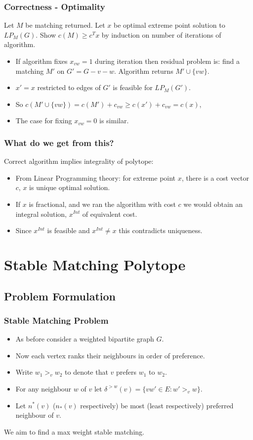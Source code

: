 \documentclass{beamer}
\begin{document}
\begin{frame}
\frametitle{Correctness - Optimality}
Let $M$ be matching returned. Let $x$ be optimal extreme point solution to $LP_M(G)$. Show $c(M) \geq c^Tx$ by induction on number of iterations of algorithm.
\begin{itemize}
\item<1-> If algorithm fixes $x_{vw} = 1$ during iteration then residual problem is: find a matching $M'$ on $G'=G-v-w$. Algorithm returns $M' \cup \{vw\}$.
\item<2-> $x' = x$ restricted to edges of $G'$ is feasible for $LP_M(G')$.
\item<3-> So $c(M' \cup \{vw\}) = c(M') + c_{vw} \geq c(x') + c_{vw} = c(x)$,
\item<4-> The case for fixing $x_{vw} = 0$ is similar.
\end{itemize}
\end{frame}

\begin{frame}
\frametitle{What do we get from this?}
Correct algorithm implies integrality of polytope:
\begin{itemize}
\item  From Linear Programming theory:  for extreme point $x$, there is a cost vector $c$, $x$ is unique optimal solution.
\item If $x$ is fractional, and we ran the algorithm with cost $c$ we would obtain an integral solution, $x^{Int}$ of equivalent cost.
\item Since $x^{Int}$ is feasible and $x^{Int} \neq x$ this contradicts uniqueness.
\end{itemize}
\end{frame}

\section{Stable Matching Polytope}
\subsection{Problem Formulation}
\begin{frame}
\frametitle{Stable Matching Problem}
\begin{itemize} \item As before consider a weighted bipartite graph $G$. \item Now each vertex ranks their neighbours in order of preference. \item Write $w_1 >_v w_2$ to denote that $v$ prefers $w_1$ to $w_2$. \item For any neighbour $w$ of $v$ let $\delta^{>w}(v) = \{vw' \in E : w' >_v w\}$. \item Let $n^*(v)$ ($n_*(v)$ respectively) be most (least respectively) preferred neighbour of $v$. \end{itemize} We aim to find a max weight stable matching.
\end{frame}
\end{document}
